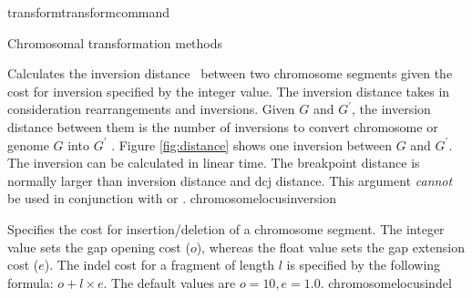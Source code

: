\begin{command}{transform}{transformcommand}
\begin{arguments}
\begin{argumentgroup}{Chromosomal transformation methods}
\begin{description}
                        {Calculates the inversion distance~\cite{hanenhalliandpevzner1995}
                        between two chromosome segments given the cost for inversion
                        specified by the integer value. The inversion distance
                        takes in consideration rearrangements and
                        inversions. Given $G$ and $G^\prime$, the inversion distance between
                        them is the number of inversions to convert chromosome or genome $G$ 
                        into $G^\prime$ \cite{hanenhalliandpevzner1995}. Figure \ref{fig:distance} shows one inversion  
                        between $G$ and $G^\prime$. The inversion can be calculated in linear time.
                        The breakpoint distance is normally larger than
                        inversion distance  and dcj distance.
                        This argument \emph{cannot} be used in conjunction with
                         or
                        .} 
                        {chromosomelocusinversion}  

                        {Specifies the cost for insertion/deletion of a
                        chromosome segment. The integer value sets the gap opening
                        cost ($o$), whereas the float value sets the gap extension
                        cost ($e$).  The indel cost for a fragment of length $l$ is
                        specified by the following formula:
                       $o + l \times e$. The default values are $o=10, e=1.0$.}
                        {chromosomelocusindel}


\end{description}
\end{argumentgroup}
\end{arguments}
\end{command}
